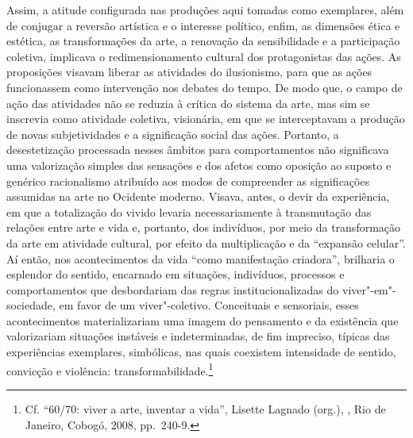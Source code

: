 Assim, a atitude configurada nas produções aqui tomadas como exemplares,
além de conjugar a reversão artística e o interesse político, enfim, as
dimensões ética e estética, as transformações da arte, a renovação da
sensibilidade e a participação coletiva, implicava o redimensionamento
cultural dos protagonistas das ações. As proposições visavam liberar as
atividades do ilusionismo, para que as ações funcionassem como
intervenção nos debates do tempo. De modo que, o campo de ação das
atividades não se reduzia à crítica do sistema da arte, mas sim se
inscrevia como atividade coletiva, visionária, em que se interceptavam a
produção de novas subjetividades e a significação social das ações.
Portanto, a desestetização processada nesses âmbitos para comportamentos
não significava uma valorização simples das sensações e dos afetos como
oposição ao suposto e genérico racionalismo atribuído aos modos de
compreender as significações assumidas na arte no Ocidente moderno.
Visava, antes, o devir da experiência, em que a totalização do vivido
levaria necessariamente à transmutação das relações entre arte e vida e,
portanto, dos indivíduos, por meio da transformação da arte em atividade
cultural, por efeito da multiplicação e da ``expansão celular''. Aí
então, nos acontecimentos da vida ``como manifestação criadora'',
brilharia o esplendor do sentido, encarnado em situações, indivíduos,
processos e comportamentos que desbordariam das regras
institucionalizadas do viver"-em"-sociedade, em favor de um
viver"-coletivo. Conceituais e sensoriais, esses acontecimentos
materializariam uma imagem do pensamento e da existência que
valorizariam situações instáveis e indeterminadas, de fim impreciso,
típicas das experiências exemplares, simbólicas, nas quais coexistem
intensidade de sentido, convicção e violência:
transformabilidade.\footnote{Cf. ``60/70: viver a arte, inventar a
vida'', Lisette Lagnado (org.), {}, Rio de Janeiro, Cobogó, 2008, pp.~240-9.}

\pagebreak

\setcounter{footnote}{0}
\begin{vplace}[0.25]
\thispagestyle{empty}
{\large{}}
\end{vplace}

